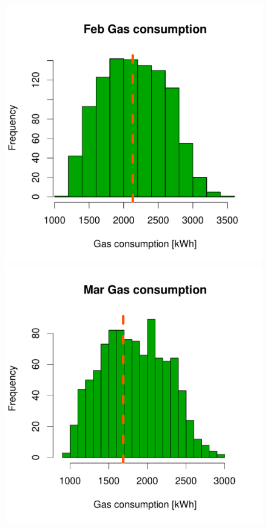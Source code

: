 \documentclass[a4paper, 12pt]{article}
\begin{document}
\begin{figure}
 \includegraphics[width=\scale]{Simulation_histograms/Batch_2_Only/Gas_Runs/Feb_Gas}
 \includegraphics[width=\scale]{Simulation_histograms/Batch_2_Only/Gas_Runs/Mar_Gas}\\

\end{figure}
\end{document}
